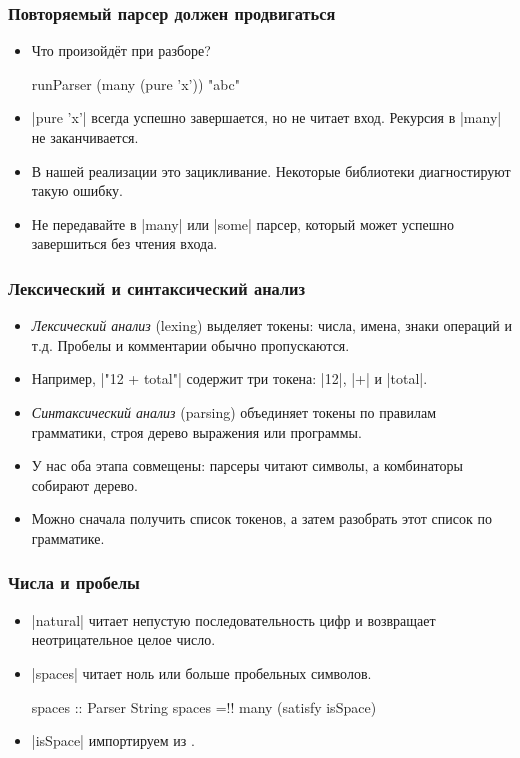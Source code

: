 \documentclass[11pt]{beamer}
\begin{document}
\begin{frame}[fragile]
  \frametitle{Повторяемый парсер должен продвигаться}
  \begin{itemize}
    \item Что произойдёт при разборе?
      \begin{haskell}
        runParser (many (pure 'x')) "abc"
      \end{haskell}
      \pause
    \item \haskinline|pure 'x'| всегда успешно завершается, но не читает вход. Рекурсия в \haskinline|many| не заканчивается.
    \item В нашей реализации это зацикливание. Некоторые библиотеки диагностируют такую ошибку.
    \item Не передавайте в \haskinline|many| или \haskinline|some| парсер, который может успешно завершиться без чтения входа.
  \end{itemize}
\end{frame}

\begin{frame}[fragile]
  \frametitle{Лексический и синтаксический анализ}
  \begin{itemize}
    \item \emph{Лексический анализ} (lexing) выделяет токены: числа, имена, знаки операций и т.д. Пробелы и комментарии обычно пропускаются.
    \item Например, \haskinline|"12 + total"| содержит три токена: \haskinline|12|, \haskinline|+| и \haskinline|total|.
      \pause
    \item \emph{Синтаксический анализ} (parsing) объединяет токены по правилам грамматики, строя дерево выражения или программы.
      \pause
    \item У нас оба этапа совмещены: парсеры читают символы, а комбинаторы собирают дерево.
    \item Можно сначала получить список токенов, а затем разобрать этот список по грамматике.
  \end{itemize}
\end{frame}

\begin{frame}[fragile]
  \frametitle{Числа и пробелы}
  \begin{itemize}
    \item \haskinline|natural| читает непустую последовательность цифр и возвращает неотрицательное целое число.
      \pause
      \pause
    \item \haskinline|spaces| читает ноль или больше пробельных символов.
      \pause
      \begin{haskellsmall}
        spaces :: Parser String
        spaces =!\pause! many (satisfy isSpace)
      \end{haskellsmall}
    \item \haskinline|isSpace| импортируем из \href{https://hackage.haskell.org/package/base/docs/Data-Char.html}{}.
  \end{itemize}
\end{frame}
\end{document}
